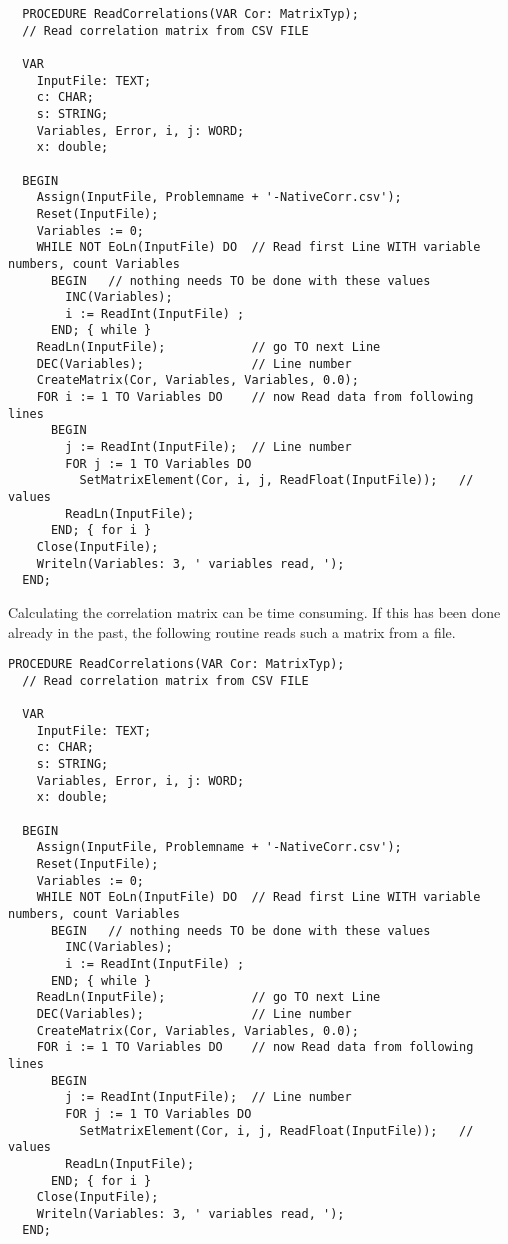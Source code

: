 \begin{lstlisting}
  PROCEDURE ReadCorrelations(VAR Cor: MatrixTyp);
  // Read correlation matrix from CSV FILE

  VAR
    InputFile: TEXT;
    c: CHAR;
    s: STRING;
    Variables, Error, i, j: WORD;
    x: double;

  BEGIN
    Assign(InputFile, Problemname + '-NativeCorr.csv');
    Reset(InputFile);
    Variables := 0;
    WHILE NOT EoLn(InputFile) DO  // Read first Line WITH variable numbers, count Variables
      BEGIN   // nothing needs TO be done with these values
        INC(Variables);
        i := ReadInt(InputFile) ;
      END; { while }
    ReadLn(InputFile);            // go TO next Line
    DEC(Variables);               // Line number
    CreateMatrix(Cor, Variables, Variables, 0.0);
    FOR i := 1 TO Variables DO    // now Read data from following lines
      BEGIN
        j := ReadInt(InputFile);  // Line number
        FOR j := 1 TO Variables DO
          SetMatrixElement(Cor, i, j, ReadFloat(InputFile));   // values
        ReadLn(InputFile);
      END; { for i }
    Close(InputFile);
    Writeln(Variables: 3, ' variables read, ');
  END;
\end{lstlisting}

Calculating the correlation matrix can be time consuming. If this has been done already in the past, the following routine reads such a matrix from a file.

\begin{lstlisting}[caption=Read correlation matrix from a csv-file]
  PROCEDURE ReadCorrelations(VAR Cor: MatrixTyp);
  // Read correlation matrix from CSV FILE

  VAR
    InputFile: TEXT;
    c: CHAR;
    s: STRING;
    Variables, Error, i, j: WORD;
    x: double;

  BEGIN
    Assign(InputFile, Problemname + '-NativeCorr.csv');
    Reset(InputFile);
    Variables := 0;
    WHILE NOT EoLn(InputFile) DO  // Read first Line WITH variable numbers, count Variables
      BEGIN   // nothing needs TO be done with these values
        INC(Variables);
        i := ReadInt(InputFile) ;
      END; { while }
    ReadLn(InputFile);            // go TO next Line
    DEC(Variables);               // Line number
    CreateMatrix(Cor, Variables, Variables, 0.0);
    FOR i := 1 TO Variables DO    // now Read data from following lines
      BEGIN
        j := ReadInt(InputFile);  // Line number
        FOR j := 1 TO Variables DO
          SetMatrixElement(Cor, i, j, ReadFloat(InputFile));   // values
        ReadLn(InputFile);
      END; { for i }
    Close(InputFile);
    Writeln(Variables: 3, ' variables read, ');
  END;
\end{lstlisting}

